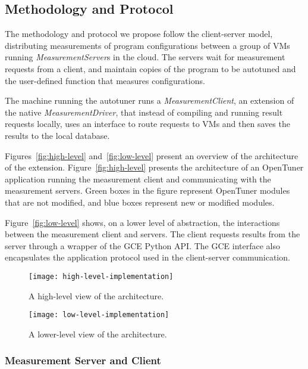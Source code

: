 \subsection{Methodology and Protocol}
\label{sec:ext}

The methodology and protocol we propose follow the client-server model,
distributing measurements of program configurations between a group of VMs
running \emph{MeasurementServer}s in the cloud. The servers wait for
measurement requests from a client, and maintain copies of the program to be
autotuned and the user-defined function that measures configurations.

The machine running the autotuner runs a \emph{MeasurementClient}, an
extension of the native \emph{MeasurementDriver}, that instead of compiling and
running result requests locally, uses an interface to route requests to VMs and
then saves the results to the local database.

Figures~\ref{fig:high-level} and~\ref{fig:low-level} present an overview of the
architecture of the extension.  Figure~\ref{fig:high-level} presents the
architecture of an OpenTuner application running the measurement client and
communicating with the measurement servers.  Green boxes in the figure
represent OpenTuner modules that are not modified, and blue boxes represent new
or modified modules.

Figure~\ref{fig:low-level} shows, on a lower level of abstraction, the
interactions between the measurement client and servers. The client requests
results from the server through a wrapper of the GCE Python API.  The GCE
interface also encapsulates the application protocol used in the client-server
communication.

\begin{figure}[htpb]
    \centering
    \begin{minipage}{.45\textwidth}
        \centering
        \texttt{[image: high-level-implementation]}
        \caption{A high-level view of the architecture.}
        \label{fig:high-level}
    \end{minipage}%
    \hfill
    \begin{minipage}{.45\textwidth}
        \centering
        \texttt{[image: low-level-implementation]}
        \caption{A lower-level view of the architecture.}
        \label{fig:low-level}
    \end{minipage}%
    \label{fig:archs}
\end{figure}

\subsubsection{Measurement Server and Client}
\label{sec:server-client}

